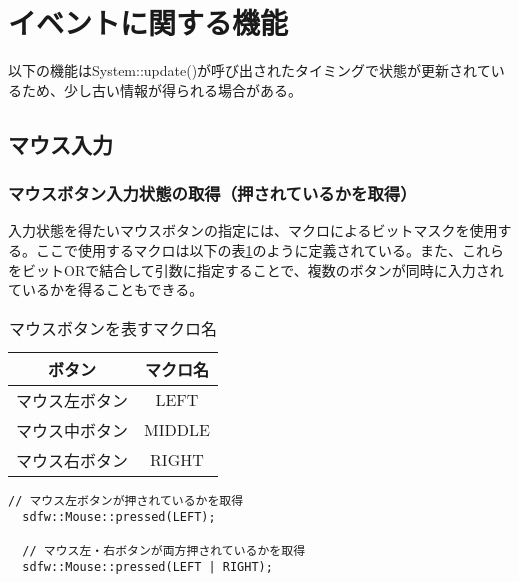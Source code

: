 \documentclass[a4paper, 11pt, oneside, onecolumn, openany]{jsarticle}
\begin{document}
\section{イベントに関する機能}
以下の機能はSystem::update()が呼び出されたタイミングで状態が更新されているため、少し古い情報が得られる場合がある。
\subsection{マウス入力}
\subsubsection{マウスボタン入力状態の取得（押されているかを取得）}
入力状態を得たいマウスボタンの指定には、マクロによるビットマスクを使用する。ここで使用するマクロは以下の表\ref{macro-MouseButton}のように定義されている。また、これらをビットORで結合して引数に指定することで、複数のボタンが同時に入力されているかを得ることもできる。
\begin{table}[H]
  \caption{マウスボタンを表すマクロ名}
  \label{macro-MouseButton}
  \centering
  \begin{tabular}{cc}
    \hline
    ボタン & マクロ名 \\
    \hline \hline
    マウス左ボタン & LEFT \\
    マウス中ボタン & MIDDLE \\
    マウス右ボタン & RIGHT \\
    \hline
  \end{tabular}
\end{table}

\begin{lstlisting}[caption=使用例, label=macro-GetMouseButtonState, keepspaces=true]
  // マウス左ボタンが押されているかを取得
  sdfw::Mouse::pressed(LEFT);

  // マウス左・右ボタンが両方押されているかを取得
  sdfw::Mouse::pressed(LEFT | RIGHT);
\end{lstlisting}
\end{document}
